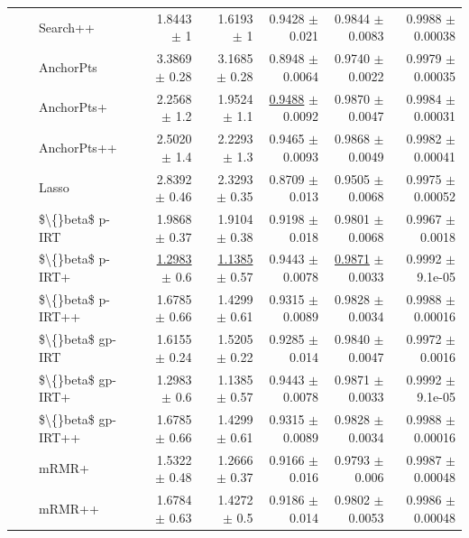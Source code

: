 \begin{longtable}{llp{}rrrrr}
 &  & Search++ & 1.8443 {\scriptsize $\pm$ 1} & 1.6193 {\scriptsize $\pm$ 1} & 0.9428 {\scriptsize $\pm$ 0.021} & 0.9844 {\scriptsize $\pm$ 0.0083} & 0.9988 {\scriptsize $\pm$ 0.00038} \\
 &  & AnchorPts & 3.3869 {\scriptsize $\pm$ 0.28} & 3.1685 {\scriptsize $\pm$ 0.28} & 0.8948 {\scriptsize $\pm$ 0.0064} & 0.9740 {\scriptsize $\pm$ 0.0022} & 0.9979 {\scriptsize $\pm$ 0.00035} \\
 &  & AnchorPts+ & 2.2568 {\scriptsize $\pm$ 1.2} & 1.9524 {\scriptsize $\pm$ 1.1} & \underline{0.9488} {\scriptsize $\pm$ 0.0092} & 0.9870 {\scriptsize $\pm$ 0.0047} & 0.9984 {\scriptsize $\pm$ 0.00031} \\
 &  & AnchorPts++ & 2.5020 {\scriptsize $\pm$ 1.4} & 2.2293 {\scriptsize $\pm$ 1.3} & 0.9465 {\scriptsize $\pm$ 0.0093} & 0.9868 {\scriptsize $\pm$ 0.0049} & 0.9982 {\scriptsize $\pm$ 0.00041} \\
 &  & Lasso & 2.8392 {\scriptsize $\pm$ 0.46} & 2.3293 {\scriptsize $\pm$ 0.35} & 0.8709 {\scriptsize $\pm$ 0.013} & 0.9505 {\scriptsize $\pm$ 0.0068} & 0.9975 {\scriptsize $\pm$ 0.00052} \\
 &  & \$\textbackslash\{\}beta\$ p-IRT & 1.9868 {\scriptsize $\pm$ 0.37} & 1.9104 {\scriptsize $\pm$ 0.38} & 0.9198 {\scriptsize $\pm$ 0.018} & 0.9801 {\scriptsize $\pm$ 0.0068} & 0.9967 {\scriptsize $\pm$ 0.0018} \\
 &  & \$\textbackslash\{\}beta\$ p-IRT+ & \underline{1.2983} {\scriptsize $\pm$ 0.6} & \underline{1.1385} {\scriptsize $\pm$ 0.57} & 0.9443 {\scriptsize $\pm$ 0.0078} & \underline{0.9871} {\scriptsize $\pm$ 0.0033} & 0.9992 {\scriptsize $\pm$ 9.1e-05} \\
 &  & \$\textbackslash\{\}beta\$ p-IRT++ & 1.6785 {\scriptsize $\pm$ 0.66} & 1.4299 {\scriptsize $\pm$ 0.61} & 0.9315 {\scriptsize $\pm$ 0.0089} & 0.9828 {\scriptsize $\pm$ 0.0034} & 0.9988 {\scriptsize $\pm$ 0.00016} \\
 &  & \$\textbackslash\{\}beta\$ gp-IRT & 1.6155 {\scriptsize $\pm$ 0.24} & 1.5205 {\scriptsize $\pm$ 0.22} & 0.9285 {\scriptsize $\pm$ 0.014} & 0.9840 {\scriptsize $\pm$ 0.0047} & 0.9972 {\scriptsize $\pm$ 0.0016} \\
 &  & \$\textbackslash\{\}beta\$ gp-IRT+ & 1.2983 {\scriptsize $\pm$ 0.6} & 1.1385 {\scriptsize $\pm$ 0.57} & 0.9443 {\scriptsize $\pm$ 0.0078} & 0.9871 {\scriptsize $\pm$ 0.0033} & 0.9992 {\scriptsize $\pm$ 9.1e-05} \\
 &  & \$\textbackslash\{\}beta\$ gp-IRT++ & 1.6785 {\scriptsize $\pm$ 0.66} & 1.4299 {\scriptsize $\pm$ 0.61} & 0.9315 {\scriptsize $\pm$ 0.0089} & 0.9828 {\scriptsize $\pm$ 0.0034} & 0.9988 {\scriptsize $\pm$ 0.00016} \\
 &  & mRMR+ & 1.5322 {\scriptsize $\pm$ 0.48} & 1.2666 {\scriptsize $\pm$ 0.37} & 0.9166 {\scriptsize $\pm$ 0.016} & 0.9793 {\scriptsize $\pm$ 0.006} & 0.9987 {\scriptsize $\pm$ 0.00048} \\
 &  & mRMR++ & 1.6784 {\scriptsize $\pm$ 0.63} & 1.4272 {\scriptsize $\pm$ 0.5} & 0.9186 {\scriptsize $\pm$ 0.014} & 0.9802 {\scriptsize $\pm$ 0.0053} & 0.9986 {\scriptsize $\pm$ 0.00048} \\
\end{longtable}
